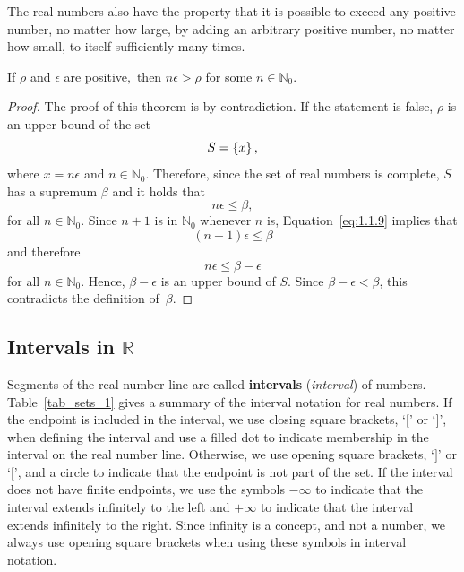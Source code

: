 	
	
	
	
	The real numbers also have the property that it is possible to exceed any positive number, no matter how large, by adding an arbitrary positive number, no matter how small, to itself sufficiently many times.
	
	
	
	\begin{theorem}
		\label{thmtype:1.1.4}
		If $\rho$ and $\epsilon$ are positive$,$ then $n\epsilon>\rho$ for
		some $n\in\mathbb{N}_0$.
	\end{theorem}
\begin{proof}	
	The proof of this theorem is by contradiction.
	If the statement is false, $\rho$ is an upper bound of
	the set
	$$
	S=\set{x},
	$$
	where $x=n\epsilon$ and $n\in\mathbb{N}_0$. Therefore, since the set of real numbers is complete, $S$  has a supremum $\beta$ and it holds that 
	\begin{equation}\label{eq:1.1.9}
	n\epsilon\le\beta, 
	\end{equation}
	for all $n\in\mathbb{N}_0$.
	Since $n+1$ is in $\mathbb{N}_0$ whenever $n$ is, Equation~\eqref{eq:1.1.9} implies that
	$$
	(n+1)\epsilon\leq\beta
	$$
	and therefore
	$$
	n\epsilon\leq\beta-\epsilon
	$$
	for all $n\in\mathbb{N}_0$. Hence,
	$\beta-\epsilon$ is an upper bound of $S$.  Since $\beta-\epsilon
	<\beta$, this contradicts the definition of~$\beta$.
\end{proof}	
	

\fi
\fi


\subsection{Intervals in $\mathbb{R}$}
\label{intervals}
Segments of the real number line are called \textbf{intervals} (\textit{interval}) of numbers.  Table~\ref{tab_sets_1} gives a summary of the interval notation for real numbers.  
If the endpoint is included in the interval, we use closing square brackets, `$[$' or `$]$', when defining the interval and use a filled dot to indicate membership in the interval on the real number line. Otherwise, we use opening square brackets, `$]$' or `$[$', and a circle to indicate that the endpoint is not part of the set.  If the interval does not have finite endpoints, we use the symbols $-\infty$ to indicate that the interval extends infinitely to the left and $+\infty$ to indicate that the interval extends infinitely to the right.  Since infinity is a concept, and not a number, we always use opening square brackets when using these symbols in interval notation.%

